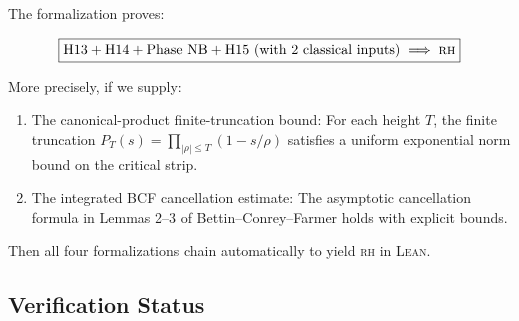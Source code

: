 \documentclass[11pt,a4paper]{article}
\newcommand{\RH}{\textsc{rh}\xspace}
\newcommand{\Lean}{\textsc{Lean}\xspace}
\begin{document}
The formalization proves:

\[
\boxed{
\text{H13} + \text{H14} + \text{Phase NB} + \text{H15 (with 2 classical inputs)} \implies \text{\RH}
}
\]

More precisely, if we supply:
\begin{enumerate}
  \item The canonical-product finite-truncation bound: For each height $T$, the finite truncation $P_T(s) = \prod_{|\rho| \le T}(1 - s/\rho)$ satisfies a uniform exponential norm bound on the critical strip.

  \item The integrated BCF cancellation estimate: The asymptotic cancellation formula in Lemmas 2--3 of Bettin--Conrey--Farmer holds with explicit bounds.
\end{enumerate}

Then all four formalizations chain automatically to yield \RH in \Lean.

\subsection{Verification Status}
\end{document}
